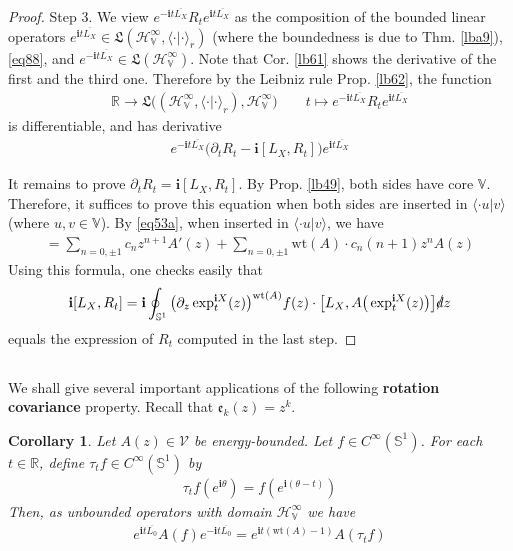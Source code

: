 \documentclass[12pt,b5paper,notitlepage]{article}
\theoremstyle{definition}
\theoremstyle{plain}
\newtheorem{co}[df]{Corollary}
\newcommand{\fk}{\mathfrak}
\newcommand{\mc}{\mathcal}
\newcommand{\ovl}{\overline}
\newcommand{\bk}[1]{\langle {#1}\rangle}
\newcommand{\im}{\mathbf{i}}
\newcommand{\Vbb}{\mathbb V}
\newcommand{\Rbb}{\mathbb R}
\newcommand{\wt}{\mathrm{wt}}
\newcommand{\Sbb}{{\mathbb S}}
\newcommand{\HV}{\mathcal H_{\mathbb V}}
\newcommand{\ek}{\mathfrak{e}}
\newcommand{\ointn}{\oint\nolimits}
\newcommand{\sd}{\slashed{d}}
\numberwithin{equation}{section}
\begin{document}
\begin{proof}
Step 3. We view $e^{-\im t\ovl{L_X}} R_te^{\im t\ovl{L_X}}$ as the composition of the bounded linear operators $e^{\im t\ovl{L_X}}\in\fk L(\HV^\infty,\bk{\cdot|\cdot}_r)$ (where the boundedness is due to Thm. \ref{lba9}), \eqref{eq88}, and $e^{-\im t\ovl{L_X}}\in\fk L(\HV^\infty)$. Note that Cor. \ref{lb61} shows the derivative of the first and the third one. Therefore by the Leibniz rule Prop. \ref{lb62}, the function
\begin{align*}
\Rbb\rightarrow\fk L\big((\HV^\infty,\bk{\cdot|\cdot}_r),\HV^\infty\big) \tag{a}\qquad t\mapsto e^{-\im t\ovl{L_X}}R_te^{\im t\ovl{L_X}}
\end{align*}
is differentiable, and has derivative
\begin{align*}
e^{-\im t\ovl{L_X}}\big(\partial_tR_t-\im [L_X,R_t] \big)e^{\im t\ovl{L_X}}
\end{align*}


It remains to prove $\partial_tR_t=\im [L_X,R_t]$. By Prop. \ref{lb49}, both sides have core $\Vbb$. Therefore, it suffices to prove this equation when both sides are inserted in $\bk{\cdot u|v}$ (where $u,v\in\Vbb$). By \eqref{eq53a}, when inserted in $\bk{\cdot u|v}$, we have
\begin{align*}
[L_X,R_t]=\sum_{n=0,\pm1}c_nz^{n+1}A'(z)+\sum_{n=0,\pm1}\wt(A)\cdot c_n(n+1)z^nA(z)
\end{align*}
Using this formula, one checks easily that
\begin{align*}
\im[L_X,R_t]=\im\ointn_{\Sbb^1} \big(\partial_z\exp^{\im X}_t(z)\big)^{\wt(A)}f(z)\cdot \big[L_X,A\big(\exp^{\im X}_t(z)\big)\big]\sd z
\end{align*}
equals the expression of $R_t$ computed in the last step.
\end{proof}




\subsection{}


We shall give several important applications of the following \textbf{rotation covariance} property. Recall that $\ek_k(z)=z^k$.

\begin{co}\label{lb67}
Let $A(z)\in\mc V$ be energy-bounded. Let $f\in C^\infty(\Sbb^1)$. For each $t\in\Rbb$, define $\tau_tf\in C^\infty(\Sbb^1)$ by
\begin{align*}
\tau_tf(e^{\im\theta})=f(e^{\im(\theta-t)})
\end{align*}
Then, as unbounded operators with domain $\HV^\infty$ we have
\begin{align}
e^{\im t\ovl{L_0}}A(f)e^{-\im t\ovl{L_0}}=e^{\im t(\wt(A)-1)}A(\tau_tf)
\end{align}
\end{co}
\end{document}
